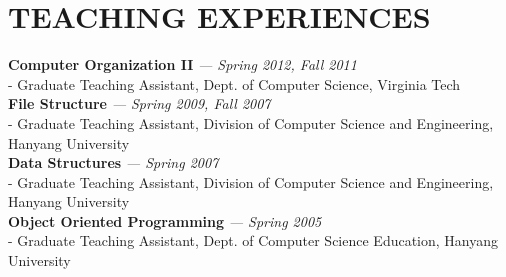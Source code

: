 \section{TEACHING EXPERIENCES} 
\vspace{0.07in} 
   {\bf Computer Organization II}
   {\it \footnotesize --- Spring 2012, Fall 2011}\\
      - {\small Graduate Teaching Assistant, Dept. of Computer Science, Virginia
      Tech}
\vspace{0.03in}\\
   {\bf File Structure}
   {\it \footnotesize --- Spring 2009, Fall 2007}\\
      - {\small Graduate Teaching Assistant, Division of Computer Science and
      Engineering, Hanyang University}
\vspace{0.03in}\\
   {\bf Data Structures}
   {\it \footnotesize --- Spring 2007}\\
      - {\small Graduate Teaching Assistant, Division of Computer Science and
      Engineering, Hanyang University}
\vspace{0.03in}\\
   {\bf Object Oriented Programming}
   {\it \footnotesize --- Spring 2005}\\
      - {\small Graduate Teaching Assistant, Dept. of Computer Science
      Education, Hanyang University}

